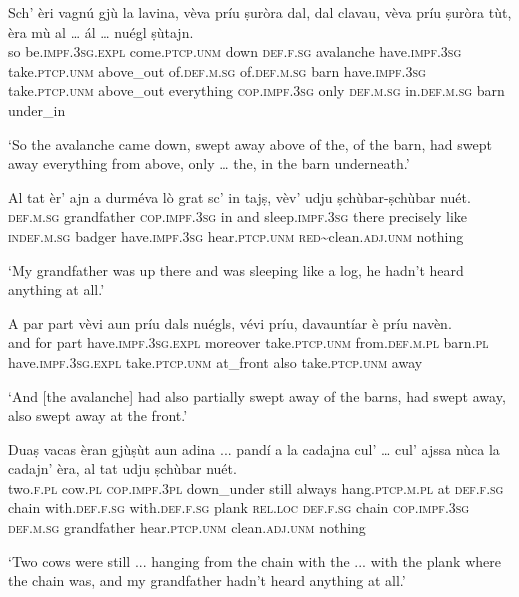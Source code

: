 \begin{linenumbers}
\gll Sch’ èri vagnú gjù la lavina, vèva príu ṣuròra dal, dal clavau, vèva príu ṣuròra tùt, èra mù al … ál … nuégl ṣùtajn.\\
so be.\textsc{impf.3sg}.\textsc{expl} come.\textsc{ptcp.unm} down \textsc{def.f.sg} avalanche have.\textsc{impf.3sg} take.\textsc{ptcp.unm} above\_out of.\textsc{def.m.sg} of.\textsc{def.m.sg} barn have.\textsc{impf.3sg} take.\textsc{ptcp.unm} above\_out everything \textsc{cop.impf.3sg} only \textsc{def.m.sg} {} in.\textsc{def.m.sg} {} barn under\_in \\
\end{linenumbers}
\medskip
\glt `So the avalanche came down, swept away above of the, of the barn, had swept away everything from above, only … the, in the barn underneath.'
\medskip

\begin{linenumbers}
\gll  Al tat èr’ ajn a durméva lò grat sc’ in tajṣ, vèv’ udju ṣchùbar-ṣchùbar nuét.  \\
 \textsc{def.m.sg} grandfather \textsc{cop.impf.3sg} in and sleep.\textsc{impf.3sg} there precisely like \textsc{indef.m.sg} badger have.\textsc{impf.3sg} hear.\textsc{ptcp.unm} \textsc{red}\textasciitilde{clean}.\textsc{adj.unm} nothing\\
\end{linenumbers}
\medskip
\glt `My grandfather was up there and was sleeping like a log, he hadn’t heard anything at all.'
\medskip

\begin{linenumbers}
\gll  A par part vèvi aun príu dals nuégls, vévi príu, davauntíar è príu navèn.\\
and for part have.\textsc{impf.3sg.expl} moreover take.\textsc{ptcp.unm} from.\textsc{def.m.pl} barn.\textsc{pl} 
have.\textsc{impf.3sg.expl} take.\textsc{ptcp.unm} at\_front also take.\textsc{ptcp.unm} away \\
\end{linenumbers}
\medskip
\glt `And [the avalanche] had also partially swept away of the barns, had swept away, also swept away at the front.'
\medskip

\begin{linenumbers}
\gll  Duaṣ vacas èran gjùṣùt aun adina ...  pandí\footnotemark{} a la cadajna cul’ … cul’ ajssa nùca la cadajn' èra, al tat udju ṣchùbar nuét.  \\
 two.\textsc{f.pl} cow.\textsc{pl} \textsc{cop.impf.3pl} down\_under still always {} hang.\textsc{ptcp.m.pl} at \textsc{def.f.sg} chain with.\textsc{def.f.sg} {} with.\textsc{def.f.sg} plank \textsc{rel.loc} \textsc{def.f.sg} chain \textsc{cop.impf.3sg} \textsc{def.m.sg} grandfather hear.\textsc{ptcp.unm} clean.\textsc{adj.unm} nothing\\
\end{linenumbers}
\medskip
\glt `Two cows were still ... hanging  from the chain with the ... with the plank where the chain was, and my grandfather hadn’t heard anything at all.’
\medskip

